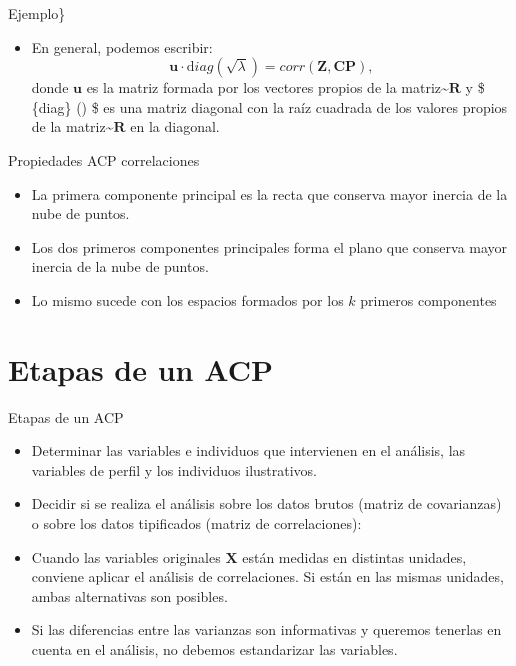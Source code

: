 \documentclass[
  spanish,
  ignorenonframetext,
]{beamer}
\providecommand{\tightlist}{%
  \setlength{\itemsep}{0pt}\setlength{\parskip}{0pt}}
\begin{document}
\begin{frame}{Ejemplo\}}
\protect\hypertarget{ejemplo-21}{}
\begin{itemize}
\tightlist
\item
  En general, podemos escribir: \[
  \mathbf{u}\cdot {\mathrm diag} (\sqrt{\lambda}) = corr(\mathbf{Z},\mathbf{CP}),
  \] donde \(\mathbf{u}\) es la matriz formada por los vectores propios
  de la matriz\textasciitilde{}\(\mathbf{R}\) y \$ \{\mathrm diag\}
  (\sqrt{\lambda}) \$ es una matriz diagonal con la raíz cuadrada de los
  valores propios de la matriz\textasciitilde{}\(\mathbf{R}\) en la
  diagonal.
\end{itemize}
\end{frame}

\begin{frame}{Propiedades ACP correlaciones}
\protect\hypertarget{propiedades-acp-correlaciones}{}
\begin{itemize}
\item
  La primera componente principal es la recta que conserva mayor inercia
  de la nube de puntos.
\item
  Los dos primeros componentes principales forma el plano que conserva
  mayor inercia de la nube de puntos.
\item
  Lo mismo sucede con los espacios formados por los \(k\) primeros
  componentes
\end{itemize}
\end{frame}

\hypertarget{etapas-de-un-acp}{%
\section{Etapas de un ACP}\label{etapas-de-un-acp}}

\begin{frame}{Etapas de un ACP}
\protect\hypertarget{etapas-de-un-acp-1}{}
\begin{itemize}
\item
  Determinar las variables e individuos que intervienen en el análisis,
  las variables de perfil y los individuos ilustrativos.
\item
  Decidir si se realiza el análisis sobre los datos brutos (matriz de
  covarianzas) o sobre los datos tipificados (matriz de correlaciones):
\item
  Cuando las variables originales \(\mathbf{X}\) están medidas en
  distintas unidades, conviene aplicar el análisis de correlaciones. Si
  están en las mismas unidades, ambas alternativas son posibles.
\item
  Si las diferencias entre las varianzas son informativas y queremos
  tenerlas en cuenta en el análisis, no debemos estandarizar las
  variables.
\end{itemize}
\end{frame}
\end{document}
